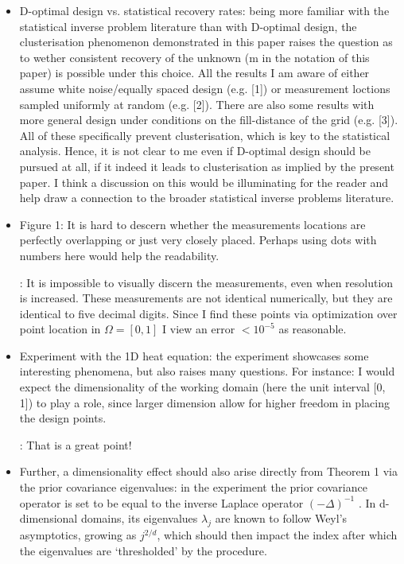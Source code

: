 \documentclass{amsart}
\begin{document}
\begin{itemize}
\item D-optimal design vs. statistical recovery rates: being more
  familiar with the statistical inverse problem literature than with
  D-optimal design, the clusterisation phenomenon demonstrated in this
  paper raises the question as to wether consistent recovery of the
  unknown (m in the notation of this paper) is possible under this
  choice. All the results I am aware of either assume white
  noise/equally spaced design (e.g. [1]) or measurement loctions
  sampled uniformly at random (e.g. [2]). There are also some
  results with more general design under conditions on the
  fill-distance of the grid (e.g. [3]). All of these specifically
  prevent clusterisation, which is key to the statistical
  analysis. Hence, it is not clear to me even if D-optimal design
  should be pursued at all, if it indeed it leads to clusterisation as
  implied by the present paper. I think a discussion on this would be
  illuminating for the reader and help draw a connection to the
  broader statistical inverse problems literature.

\item Figure 1: It is hard to descern whether the measurements
  locations are perfectly overlapping or just very closely
  placed. Perhaps using dots with numbers here would help the
  readability.

  \answer: It is impossible to visually discern the measurements, even
  when resolution is increased. These measurements are not identical
  numerically, but they are identical to five decimal digits. Since I
  find these points via optimization over point location in
  $\Omega=[0,1]$ I view an error $<10^{-5}$ as reasonable.

\item Experiment with the 1D heat equation: the experiment showcases
  some interesting phenomena, but also raises many questions. For
  instance: I would expect the dimensionality of the working domain
  (here the unit interval [0, 1]) to play a role, since larger
  dimension allow for higher freedom in placing the design points.

  \answer: That is a great point! 

\item Further, a dimensionality effect should also arise directly from
  Theorem 1 via the prior covariance eigenvalues: in the experiment
  the prior covariance operator is set to be equal to the inverse
  Laplace operator $(−\Delta)^{−1}$ . In d-dimensional domains, its
  eigenvalues $\lambda_j$ are known to follow Weyl’s asymptotics,
  growing as $j^{2/d}$, which should then impact the index after
  which the eigenvalues are ‘thresholded’ by the procedure.


\end{itemize}
\end{document}
